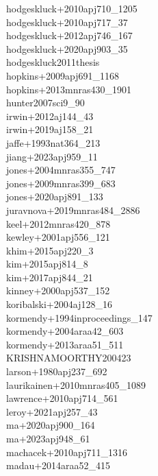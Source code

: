 \documentclass{article}
\begin{document}
\noindent hodgeskluck+2010apj710_1205 \\
\noindent hodgeskluck+2010apj717_37 \\
\noindent hodgeskluck+2012apj746_167 \\
\noindent hodgeskluck+2020apj903_35 \\
\noindent hodgeskluck2011thesis \\
\noindent hopkins+2009apj691_1168 \\
\noindent hopkins+2013mnras430_1901 \\
\noindent hunter2007sci9_90 \\
\noindent irwin+2012aj144_43 \\
\noindent irwin+2019aj158_21 \\
\noindent jaffe+1993nat364_213 \\
\noindent jiang+2023apj959_11 \\
\noindent jones+2004mnras355_747 \\
\noindent jones+2009mnras399_683 \\
\noindent jones+2020apj891_133 \\
\noindent juravnova+2019mnras484_2886 \\
\noindent keel+2012mnras420_878 \\
\noindent kewley+2001apj556_121 \\
\noindent khim+2015apj220_3 \\
\noindent kim+2015apj814_8 \\
\noindent kim+2017apj844_21 \\
\noindent kinney+2000apj537_152 \\
\noindent koribalski+2004aj128_16 \\
\noindent kormendy+1994inproceedings_147 \\
\noindent kormendy+2004araa42_603 \\
\noindent kormendy+2013araa51_511 \\
\noindent KRISHNAMOORTHY200423 \\
\noindent larson+1980apj237_692 \\
\noindent laurikainen+2010mnras405_1089 \\
\noindent lawrence+2010apj714_561 \\
\noindent leroy+2021apj257_43 \\
\noindent ma+2020apj900_164 \\
\noindent ma+2023apj948_61 \\
\noindent machacek+2010apj711_1316 \\
\noindent madau+2014araa52_415 \\
\end{document}
